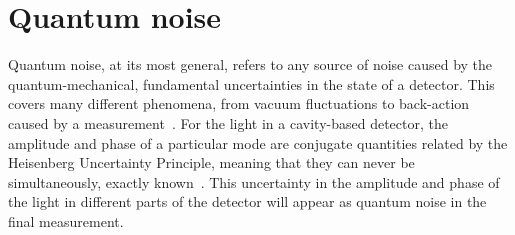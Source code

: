 \section{Quantum noise}
\label{sec:qnoise}

Quantum noise, at its most general, refers to any source of noise caused by the quantum-mechanical, fundamental uncertainties in the state of a detector. This covers many different phenomena, from vacuum fluctuations to back-action caused by a measurement~\cite{}. For the light in a cavity-based detector, the amplitude and phase of a particular mode are conjugate quantities related by the Heisenberg Uncertainty Principle, meaning that they can never be simultaneously, exactly known~\cite{}. This uncertainty in the amplitude and phase of the light in different parts of the detector will appear as quantum noise in the final measurement. %

